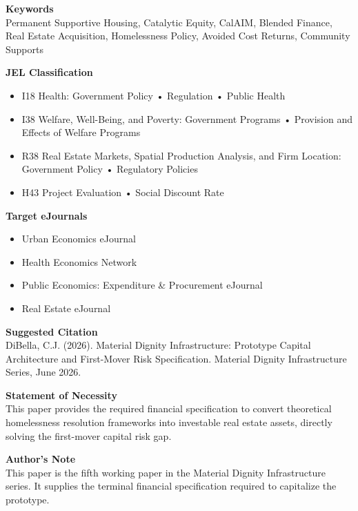 \documentclass[12pt, letterpaper]{article}
\begin{document}
\noindent\textbf{Keywords}\\[1pt]
Permanent Supportive Housing, Catalytic Equity, CalAIM, Blended Finance, Real Estate Acquisition, Homelessness Policy, Avoided Cost Returns, Community Supports

\vspace{8pt}
\noindent\textbf{JEL Classification}
\begin{itemize}[nosep, before={\vspace{-8pt}}, leftmargin=2em]
    \item I18 Health: Government Policy • Regulation • Public Health
    \item I38 Welfare, Well-Being, and Poverty: Government Programs • Provision and Effects of Welfare Programs
    \item R38 Real Estate Markets, Spatial Production Analysis, and Firm Location: Government Policy • Regulatory Policies
    \item H43 Project Evaluation • Social Discount Rate
\end{itemize}

\vspace{8pt}
\noindent\textbf{Target eJournals}
\begin{itemize}[nosep, before={\vspace{-8pt}}, leftmargin=2em]
    \item Urban Economics eJournal
    \item Health Economics Network
    \item Public Economics: Expenditure \& Procurement eJournal
    \item Real Estate eJournal
\end{itemize}

\vspace{8pt}
\noindent\textbf{Suggested Citation}\\[1pt]
DiBella, C.J. (2026). Material Dignity Infrastructure: Prototype Capital Architecture and First-Mover Risk Specification. Material Dignity Infrastructure Series, June 2026.

\newpage

\vspace{8pt}
\noindent\textbf{Statement of Necessity}\\[1pt]
This paper provides the required financial specification to convert theoretical homelessness resolution frameworks into investable real estate assets, directly solving the first-mover capital risk gap.

\vspace{8pt}
\noindent\textbf{Author's Note}\\[1pt]
This paper is the fifth working paper in the Material Dignity Infrastructure series. It supplies the terminal financial specification required to capitalize the prototype.
\end{document}
